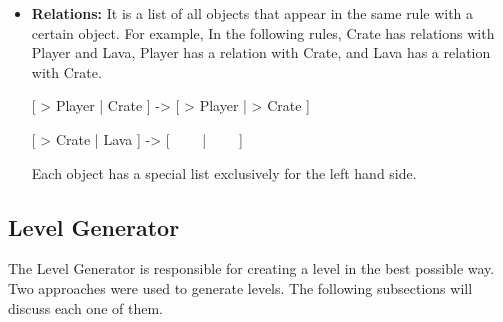 \begin{itemize}
	\begin{center}
		[ > Player | Crate ] -> [ > Player | > Crate ]
	\end{center}
	\begin{center}
		[ > Crate | Crate ] -> [ > Crate | > Crate ]
	\end{center}
	The Crate object appeared in the both rules. The first rule the Crate object appeared once, while in the second rule it appeared twice. This means the minimum number of Crates is two. This is not the case when an object has a Create behavior. Create rules are responsible for generating objects. The Minimum Number of the Create objects is updated to reflect the least number of appearances in all the Create rules. For example the following rules have two Create rules (the first and the third).
	\begin{center}
		[ > Player | \ \ \ \ ] -> [ Crate | Player ]
	\end{center}
	\begin{center}
		[ > Crate | Crate ] -> [ > Crate | > Crate ]
	\end{center}
	\begin{center}
		[ Gem | Crate | Gem ] -> [ Crate | Crate | Crate ]
	\end{center}
	The number of Crate objects in each rule are 0, 2, 1 respectively. In normal case, the minimum number of Crate object will be 2. Crate object have Create behavior (in both the first and the third rule) then the minimum number of objects will be zero instead.
	\item \textbf{Relations:} It is a list of all objects that appear in the same rule with a certain object. For example, In the following rules, Crate has relations with Player and Lava, Player has a relation with Crate, and Lava has a relation with Crate.
	\begin{center}
		[ > Player | Crate ] -> [ > Player | > Crate ]
	\end{center}
	\begin{center}
		[ > Crate | Lava ] -> [ \ \ \ \ | \ \ \ \ ]
	\end{center}
	Each object has a special list exclusively for the left hand side.	
\end{itemize}

\subsection{Level Generator}
The Level Generator is responsible for creating a level in the best possible way. Two approaches were used to generate levels. The following subsections will discuss each one of them.

